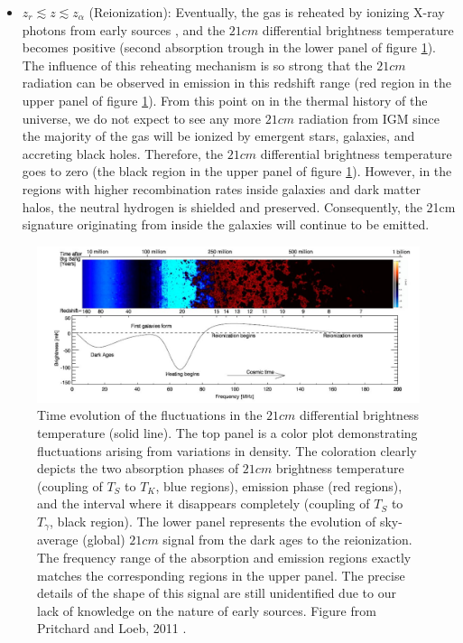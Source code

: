 \documentclass[12pt, TexShade, letterpaper]{report}
\begin{document}
\begin{itemize}
\item $z_r \lesssim z \lesssim z_\alpha$ (Reionization): Eventually, the gas is reheated by ionizing X-ray photons from early sources \cite{21century}, and the $21cm$ differential brightness temperature becomes positive (second absorption trough in the lower panel of figure \ref{fig:global_signal_pritchard_loeb}). The influence of this reheating mechanism is so strong that the $21cm$ radiation can be observed in emission in this redshift range (red region in the upper panel of figure \ref{fig:global_signal_pritchard_loeb}). From this point on in the thermal history of the universe, we do not expect to see any more $21cm$ radiation from IGM since the majority of the gas will be ionized by emergent stars, galaxies, and accreting black holes. Therefore, the $21cm$ differential brightness temperature goes to zero (the black region in the upper panel of figure \ref{fig:global_signal_pritchard_loeb}). However, in the regions with higher recombination rates inside galaxies and dark matter halos, the neutral hydrogen is shielded and preserved. Consequently, the 21cm signature originating from inside the galaxies will continue to be emitted\cite{map_universe, 21century}.\par
\end{itemize}
\begin{figure}[h!]

\centering
\includegraphics[scale =0.8]{global_signal_pritchard_loeb.jpg}
\caption[Time evolution of the fluctuations in the $21cm$ differential brightness temperature]{Time evolution of the fluctuations in the $21cm$ differential brightness temperature (solid line). The top panel is a color plot demonstrating fluctuations arising from variations in density. The coloration clearly depicts the two absorption phases of $21cm$ brightness temperature (coupling of $T_S$ to $T_K$, blue regions), emission phase (red regions), and the interval where it disappears completely (coupling of $T_S$ to $T_\gamma$, black region). The lower panel represents the evolution of sky-average (global) $21cm$ signal from the dark ages to the reionization. The frequency range of the absorption and emission regions exactly matches the corresponding regions in the upper panel. The precise details of the shape of this signal are still unidentified due to our lack of knowledge on the nature of early sources\cite{liu2013global}. Figure from Pritchard and Loeb, 2011 \cite{21century}.}
\label{fig:global_signal_pritchard_loeb}
\end{figure}
\end{document}
